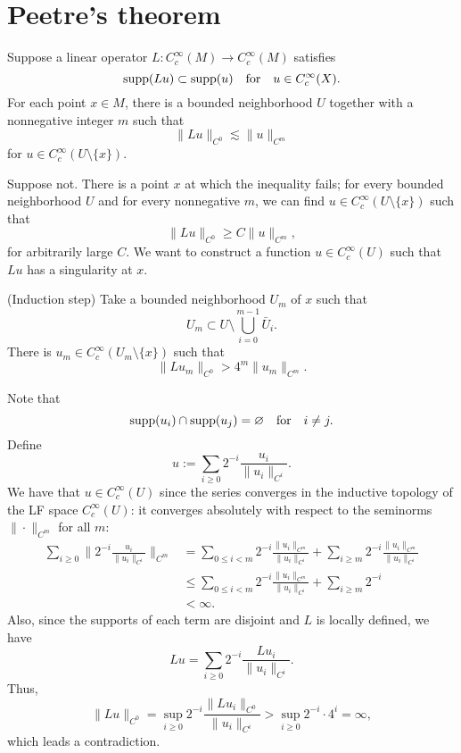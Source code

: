 \documentclass[12pt]{article}
\begin{document}
\section{Peetre's theorem}


\begin{lem}
Suppose a linear operator $L:C_c^\infty(M)\to C_c^\infty(M)$ satisfies
\[\operatorname{supp}(Lu)\subset\operatorname{supp}(u)\quad\text{for}\quad u\in C_c^\infty(X).\]
For each point $x\in M$, there is a bounded neighborhood $U$ together with a nonnegative integer $m$ such that 
\[\|Lu\|_{C^0}\lesssim\|u\|_{C^m}\]
for $u\in C_c^\infty(U\setminus\{x\})$.
\end{lem}
\begin{pf}
Suppose not.
There is a point $x$ at which the inequality fails; for every bounded neighborhood $U$ and for every nonnegative $m$, we can find $u\in C_c^\infty(U\setminus\{x\})$ such that
\[\|Lu\|_{C^0}\ge C\|u\|_{C^m},\]
for arbitrarily large $C$.
We want to construct a function $u\in C_c^\infty(U)$ such that $Lu$ has a singularity at $x$.

(Induction step)
Take a bounded neighborhood $U_m$ of $x$ such that
\[U_m\subset U\setminus\bigcup_{i=0}^{m-1}\bar U_i.\]
There is $u_m\in C_c^\infty(U_m\setminus\{x\})$ such that
\[\|Lu_m\|_{C^0}>4^m\|u_m\|_{C^m}.\]

Note that
\[\operatorname{supp}(u_i)\cap\operatorname{supp}(u_j)=\varnothing\quad\text{for}\quad i\ne j.\]
Define
\[u:=\sum_{i\ge0}2^{-i}\frac{u_i}{\|u_i\|_{C^i}}.\]
We have that $u\in C_c^\infty(U)$ since the series converges in the inductive topology of the LF space $C_c^\infty(U)$: it converges absolutely with respect to the seminorms $\|\cdot\|_{C^m}$ for all $m$:
\begin{align*}
\sum_{i\ge0}\|2^{-i}\frac{u_i}{\|u_i\|_{C^i}}\|_{C^m}
&=\sum_{0\le i<m}2^{-i}\frac{\|u_i\|_{C^m}}{\|u_i\|_{C^i}}+\sum_{i\ge m}2^{-i}\frac{\|u_i\|_{C^m}}{\|u_i\|_{C^i}}\\
&\le\sum_{0\le i<m}2^{-i}\frac{\|u_i\|_{C^m}}{\|u_i\|_{C^i}}+\sum_{i\ge m}2^{-i}\\
&<\infty.
\end{align*}
Also, since the supports of each term are disjoint and $L$ is locally defined, we have
\[Lu=\sum_{i\ge0}2^{-i}\frac{Lu_i}{\|u_i\|_{C^i}}.\]
Thus,
\[\|Lu\|_{C^0}=\sup_{i\ge0}2^{-i}\frac{\|Lu_i\|_{C^0}}{\|u_i\|_{C^i}}>\sup_{i\ge0}2^{-i}\cdot4^i=\infty,\]
which leads a contradiction.

\end{pf}
\end{document}
